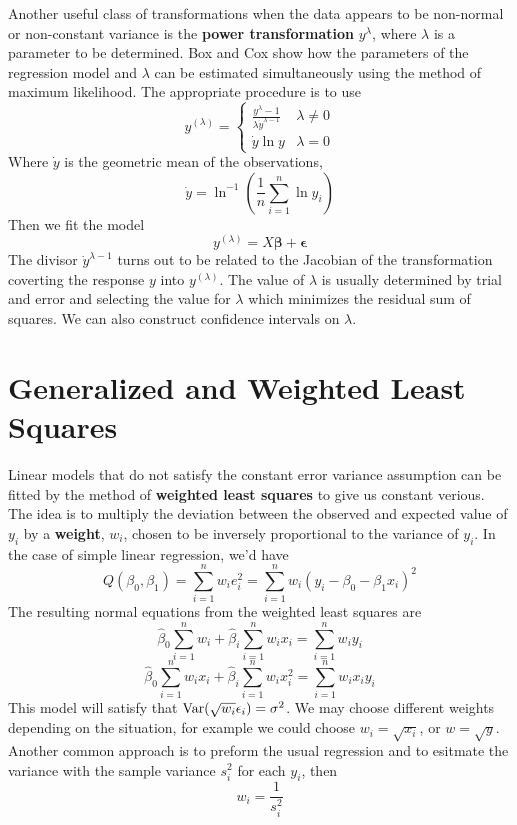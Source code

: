 Another useful class of transformations when the data appears to be non-normal or non-constant variance is the \textbf{power transformation} $y^\lambda$, where $\lambda$ is a parameter to be determined. Box and Cox show how the parameters of the regression model and $\lambda$ can be estimated simultaneously using the method of maximum likelihood. The appropriate procedure is to use 
\[y^{(\lambda)} = \begin{cases}
    \frac{y^\lambda - 1}{\lambda \dot{y}^{\lambda-1}} & \lambda \neq 0\\
    \dot{y}\ln y & \lambda = 0
\end{cases}\]
Where $\dot{y}$ is the geometric mean of the observations,
\[\dot{y} = \ln^{-1}\left(\frac{1}{n}\sum_{i=1}^n \ln y_i\right)\]
Then we fit the model 
\[y^{(\lambda)} = X\boldsymbol{\beta} + \boldsymbol{\epsilon}\]
The divisor $\dot{y}^{\lambda-1}$ turns out to be related to the Jacobian of the transformation coverting the response $y$ into $y^{(\lambda)}$. The value of $\lambda$ is usually determined by trial and error and selecting the value for $\lambda$ which minimizes the residual sum of squares. We can also construct confidence intervals on $\lambda$. 

\section{Generalized and Weighted Least Squares}

Linear models that do not satisfy the constant error variance assumption can be fitted by the method of \textbf{weighted least squares} to give us constant verious. The idea is to multiply the deviation between the observed and expected value of $y_i$ by a \textbf{weight}, $w_i$, chosen to be inversely proportional to the variance of $y_i$. In the case of simple linear regression, we'd have 
\[Q(\beta_0, \beta_1) = \sum_{i=1}^n w_ie_i^2 = \sum_{i=1}^n w_i(y_i - \beta_0 - \beta_1x_i)^2\]
The resulting normal equations from the weighted least squares are 
\[\hat{\beta}_0 \sum_{i=1}^n w_i + \hat{\beta}_i \sum_{i=1}^n w_ix_i = \sum_{i=1}^n w_iy_i\]
\[\hat{\beta}_0 \sum_{i=1}^n w_ix_i+ \hat{\beta}_i \sum_{i=1}^n w_ix_i^2 = \sum_{i=1}^n w_ix_iy_i\]
This model will satisfy that $\operatorname{Var}(\sqrt{w_i}\epsilon_i) = \sigma^2$. We may choose different weights depending on the situation, for example we could choose $w_i = \sqrt{x_i}$, or $w = \sqrt{y}$. Another common approach is to preform the usual regression and to esitmate the variance with the sample variance $s_i^2$ for each $y_i$, then 
\[w_i = \frac{1}{s_i^2}\]
